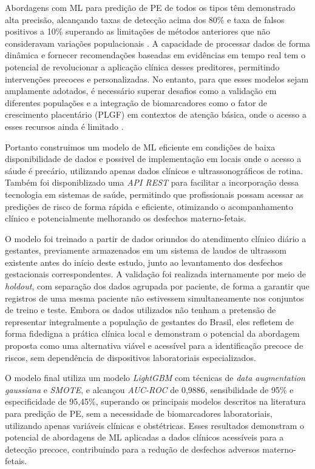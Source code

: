 \documentclass[12pt, a4paper]{report}
\theoremstyle{definition}
\theoremstyle{remark}
\theoremstyle{plain}
\begin{document}
Abordagens com ML para predição de PE de todos os tipos têm demonstrado alta precisão, alcançando taxas de detecção acima dos 80\% e taxa de falsos positivos a 10\% superando as limitações de métodos anteriores que não consideravam variações populacionais \cite{Gil2024}. A capacidade de processar dados de forma dinâmica e fornecer recomendações baseadas em evidências em tempo real tem o potencial de revolucionar a aplicação clínica desses preditores, permitindo intervenções precoces e personalizadas. No entanto, para que esses modelos sejam amplamente adotados, é necessário superar desafios como a validação em diferentes populações e a integração de biomarcadores como o fator de crescimento placentário (PLGF) em contextos de atenção básica, onde o acesso a esses recursos ainda é limitado \cite{Gil2024}.

Portanto construimos um modelo de ML eficiente em condições de baixa disponibilidade de dados e possivel de implementação em locais onde o acesso a sáude é precário, utilizando apenas dados clínicos e ultrassonográficos de rotina. Também foi disponiblizado uma \textit{API REST} para facilitar a incorporação dessa tecnologia em sistemas de saúde, permitindo que profissionais possam acessar as predições de risco de forma rápida e eficiente, otimizando o acompanhamento clínico e potencialmente melhorando os desfechos materno-fetais.

O modelo foi treinado a partir de dados oriundos do atendimento clínico diário a gestantes, previamente armazenados em um sistema de laudos de ultrassom existente antes do início deste estudo, junto ao levantamento dos desfechos gestacionais correspondentes. A validação foi realizada internamente por meio de \textit{holdout}, com separação dos dados agrupada por paciente, de forma a garantir que registros de uma mesma paciente não estivessem simultaneamente nos conjuntos de treino e teste. Embora os dados utilizados não tenham a pretensão de representar integralmente a população de gestantes do Brasil, eles refletem de forma fidedigna a prática clínica local e demonstram o potencial da abordagem proposta como uma alternativa viável e acessível para a identificação precoce de riscos, sem dependência de dispositivos laboratoriais especializados.

O modelo final utiliza um modelo \textit{LightGBM} com técnicas de \textit{data augmentation gaussiana} e \textit{SMOTE}, e alcançou \textit{AUC-ROC} de 0,9886, sensibilidade de 95\% e especificidade de 95,45\%, superando os principais modelos descritos na literatura para predição de PE, sem a necessidade de biomarcadores laboratoriais, utilizando apenas variáveis clínicas e obstétricas. Esses resultados demonstram o potencial de abordagens de ML aplicadas a dados clínicos acessíveis para a detecção precoce, contribuindo para a redução de desfechos adversos materno-fetais.
\end{document}
